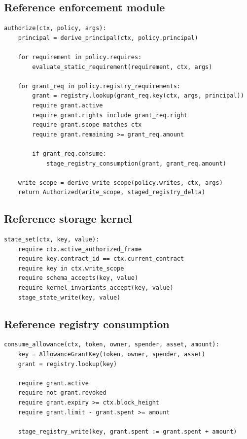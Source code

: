 \documentclass[11pt]{article}
\begin{document}
\subsection{Reference enforcement module}

\begin{lstlisting}
authorize(ctx, policy, args):
    principal = derive_principal(ctx, policy.principal)

    for requirement in policy.requires:
        evaluate_static_requirement(requirement, ctx, args)

    for grant_req in policy.registry_requirements:
        grant = registry.lookup(grant_req.key(ctx, args, principal))
        require grant.active
        require grant.rights include grant_req.right
        require grant.scope matches ctx
        require grant.remaining >= grant_req.amount

        if grant_req.consume:
            stage_registry_consumption(grant, grant_req.amount)

    write_scope = derive_write_scope(policy.writes, ctx, args)
    return Authorized(write_scope, staged_registry_delta)
\end{lstlisting}

\subsection{Reference storage kernel}

\begin{lstlisting}
state_set(ctx, key, value):
    require ctx.active_authorized_frame
    require key.contract_id == ctx.current_contract
    require key in ctx.write_scope
    require schema_accepts(key, value)
    require kernel_invariants_accept(key, value)
    stage_state_write(key, value)
\end{lstlisting}

\subsection{Reference registry consumption}

\begin{lstlisting}
consume_allowance(ctx, token, owner, spender, asset, amount):
    key = AllowanceGrantKey(token, owner, spender, asset)
    grant = registry.lookup(key)

    require grant.active
    require not grant.revoked
    require grant.expiry >= ctx.block_height
    require grant.limit - grant.spent >= amount

    stage_registry_write(key, grant.spent := grant.spent + amount)
\end{lstlisting}
\end{document}
